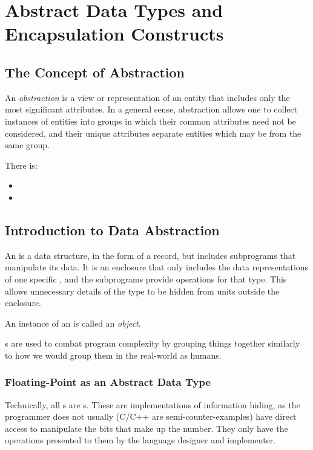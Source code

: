\section{Abstract Data Types and Encapsulation Constructs}\label{sec:Abstract_Data_Types_Encapsulation_Constructs}
\subsection{The Concept of Abstraction}\label{subsec:Concept_Abstraction}
\begin{definition}[Abstraction]\label{def:Abstraction}
  An \emph{abstraction} is a view or representation of an entity that includes only the most significant attributes.
  In a general sense, abstraction allows one to collect instances of entities into groups in which their common attributes need not be considered, and their unique attributes separate entities which may be from the same group.

  There is:
  \begin{itemize}[noitemsep]
  \item {}
  \item {}
  \end{itemize}
\end{definition}

\subsection{Introduction to Data Abstraction}\label{subsec:Intro_Data_Abstraction}
An \emph{} is a data structure, in the form of a record, but includes subprograms that manipulate its data.
It is an enclosure that only includes the data representations of one specific , and the subprograms provide operations for that type.
This allows unnecessary details of the type to be hidden from units outside the enclosure.

\begin{definition}[Object]\label{def:Object}
  An instance of an  is called an \emph{object}.
\end{definition}

s are used to combat program complexity by grouping things together similarly to how we would group them in the real-world as humans.

\subsubsection{Floating-Point as an Abstract Data Type}\label{subsubsec:Floating_Point_Abstract_Data_Type}
Technically, all s are s.
These are implementations of information hiding, as the programmer does not usually (C/C++ are semi-counter-examples) have direct access to manipulate the bits that make up the number.
They only have the operations presented to them by the language designer and implementer.

